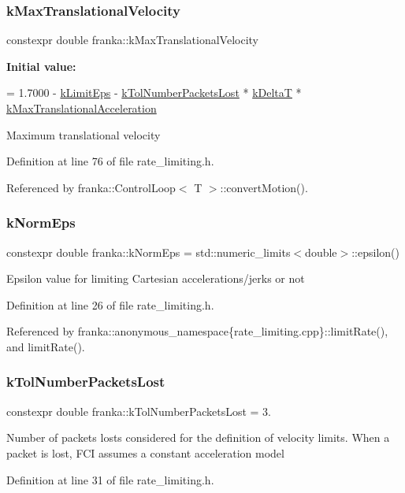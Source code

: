 \subsubsection{\texorpdfstring{k\+Max\+Translational\+Velocity}{kMaxTranslationalVelocity}}
{\footnotesize\ttfamily constexpr double franka\+::k\+Max\+Translational\+Velocity}

{\bfseries Initial value\+:}
\begin{DoxyCode}
=
    1.7000 - \hyperlink{namespacefranka_aad1f9b575274830b8da9e638559d424b}{kLimitEps} - \hyperlink{namespacefranka_a664b546834ceecd4e3220ffa92f1172c}{kTolNumberPacketsLost} * 
      \hyperlink{namespacefranka_a1e207a0d5a6e90c1e1a78e6e1057120a}{kDeltaT} * \hyperlink{namespacefranka_a3803b1a54ba526ccaa4fa0d15446f3db}{kMaxTranslationalAcceleration}
\end{DoxyCode}
Maximum translational velocity 

Definition at line 76 of file rate\+\_\+limiting.\+h.



Referenced by franka\+::\+Control\+Loop$<$ T $>$\+::convert\+Motion().

\mbox{\label{namespacefranka_a420d72830a872ef375d9d6cbb1c439b5}} 
\subsubsection{\texorpdfstring{k\+Norm\+Eps}{kNormEps}}
{\footnotesize\ttfamily constexpr double franka\+::k\+Norm\+Eps = std\+::numeric\+\_\+limits$<$double$>$\+::epsilon()}

Epsilon value for limiting Cartesian accelerations/jerks or not 

Definition at line 26 of file rate\+\_\+limiting.\+h.



Referenced by franka\+::anonymous\+\_\+namespace\{rate\+\_\+limiting.\+cpp\}\+::limit\+Rate(), and limit\+Rate().

\mbox{\label{namespacefranka_a664b546834ceecd4e3220ffa92f1172c}} 
\subsubsection{\texorpdfstring{k\+Tol\+Number\+Packets\+Lost}{kTolNumberPacketsLost}}
{\footnotesize\ttfamily constexpr double franka\+::k\+Tol\+Number\+Packets\+Lost = 3.}

Number of packets losts considered for the definition of velocity limits. When a packet is lost, F\+CI assumes a constant acceleration model 

Definition at line 31 of file rate\+\_\+limiting.\+h.

